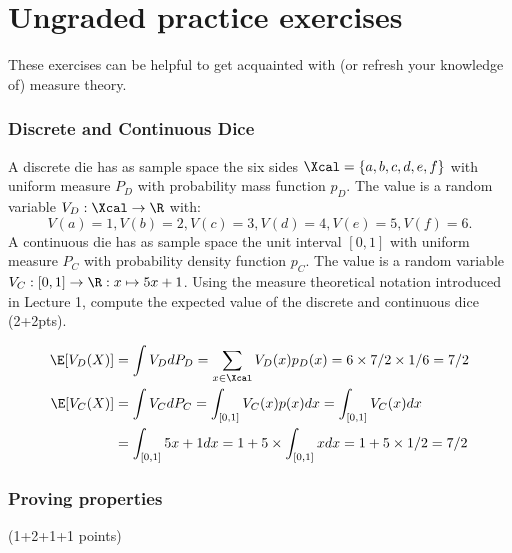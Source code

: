 \newpage
\part*{Ungraded practice exercises}

These exercises can be helpful to get acquainted with (or refresh your knowledge of) measure theory.

\section{Discrete and Continuous Dice}
A discrete die has as sample space the six sides $\Xcal=\{a, b, c, d, e, f\}$ with uniform measure $P_D$ with probability mass function $p_D$. The value is a random variable $V_D:\Xcal \to \R$ with:
 \[
     V(a)=1, V(b)=2, V(c)=3, V(d)=4, V(e)=5, V(f)=6.
 \]
 A continuous die has as sample space the unit interval $[0, 1]$ with uniform measure $P_C$ with probability density function $p_C$. The value is a random variable $V_C:[0,1] \to \R : x \mapsto 5 x + 1$. Using the measure theoretical notation introduced in Lecture 1, compute the expected value of the discrete and continuous dice (2+2pts).

 \begin{gradedsolution}
 \begin{align*}
     \E[V_D(X)]&=\int V_D dP_D= \sum_{x \in \Xcal}V_D(x)p_D(x)=6 \times 7/2 \times 1/6 = 7/2\\
     \E[V_C(X)]&=\int V_C dP_C= \int_{[0,1]}V_C(x)p(x)dx=\int_{[0,1]}V_C(x)dx \\
     &=\int_{[0,1]}5x+1dx=1+5 \times \int_{[0,1]}x dx = 1 + 5 \times 1/2=7/2
 \end{align*}
 \end{gradedsolution}

\section{Proving properties}
 (1+2+1+1 points)

